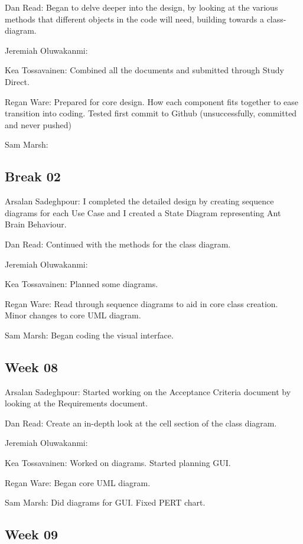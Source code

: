\documentclass[11pt]{article}
\begin{document}
Dan Read: Began to delve deeper into the design, by looking at the various methods that different objects in the code will need, building towards a class-diagram.

Jeremiah Oluwakanmi:

Kea Tossavainen: Combined all the documents and submitted through Study Direct.

Regan Ware: Prepared for core design. How each component fits together to ease transition into coding. Tested first commit to Github (unsuccessfully, committed and never pushed)

Sam Marsh: 

\subsection{Break 02}

Arsalan Sadeghpour: I completed the detailed design by creating sequence diagrams for each Use Case and I created a State Diagram representing Ant Brain Behaviour.

Dan Read: Continued with the methods for the class diagram.

Jeremiah Oluwakanmi:

Kea Tossavainen: Planned some diagrams.

Regan Ware: Read through sequence diagrams to aid in core class creation. Minor changes to core UML diagram.

Sam Marsh: Began coding the visual interface.

\subsection{Week 08}

Arsalan Sadeghpour: Started working on the Acceptance Criteria document by looking at the Requirements document.

Dan Read: Create an in-depth look at the cell section of the class diagram.

Jeremiah Oluwakanmi:

Kea Tossavainen: Worked on diagrams. Started planning GUI.

Regan Ware: Began core UML diagram.

Sam Marsh: Did diagrams for GUI. Fixed PERT chart.

\subsection{Week 09}
\end{document}
